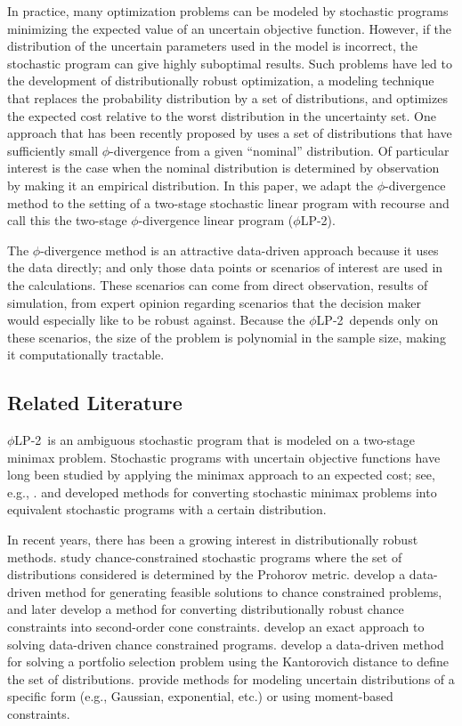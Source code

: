 \documentclass[ijoc,letterpaper]{informs3} %
\newcommand{\plp}{$\phi$LP-2}
\begin{document}
In practice, many optimization problems can be modeled by stochastic programs minimizing the expected value of an uncertain objective function.
However, if the distribution of the uncertain parameters used in the model is incorrect, the stochastic program can give highly suboptimal results.
Such problems have led to the development of distributionally robust optimization, a modeling technique that replaces the probability distribution by a set of distributions, and optimizes the expected cost relative to the worst distribution in the uncertainty set.
One approach that has been recently proposed by \cite{bental2011robust} uses a set of distributions that have sufficiently small $\phi$-divergence from a given ``nominal'' distribution.
Of particular interest is the case when the nominal distribution is determined by observation by making it an empirical distribution.
In this paper, we adapt the $\phi$-divergence method to the setting of a two-stage stochastic linear program with recourse and call this the two-stage $\phi$-divergence linear program (\plp).

The $\phi$-divergence method is an attractive data-driven approach because it uses the data directly; and only those data points or scenarios of interest are used in the calculations.
These scenarios can come from direct observation, results of simulation, from expert opinion regarding scenarios that the decision maker would especially like to be robust against.
Because the \plp\ depends only on these scenarios, the size of the problem is polynomial in the sample size, making it computationally tractable.

\subsection{Related Literature}

\plp\ is an ambiguous stochastic program that is modeled on a two-stage minimax problem.
Stochastic programs with uncertain objective functions have long been studied by applying the minimax approach to an expected cost; see, e.g., \cite{zackova1966minimax,dupacova_87}.
\cite{shapiro2002minimax} and \cite{shapiro2004class} developed methods for converting stochastic minimax problems into equivalent stochastic programs with a certain distribution.

In recent years, there has been a growing interest in distributionally robust methods.
\cite{erdogan2006ambiguous} study chance-constrained stochastic programs where the set of distributions considered is determined by the Prohorov metric.
\cite{calafiore2005uncertain} develop a data-driven method for generating feasible solutions to chance constrained problems, and later \cite{calafiore2006distributionally} develop a method for converting distributionally robust chance constraints into second-order cone constraints.
\cite{jiang2012data} develop an exact approach to solving data-driven chance constrained programs.
\cite{pflug2007ambiguity} develop a data-driven method for solving a portfolio selection problem using the Kantorovich distance to define the set of distributions.
\cite{delage2010distributionally} provide methods for modeling uncertain distributions of a specific form (e.g., Gaussian, exponential, etc.) or using moment-based constraints.
\end{document}

